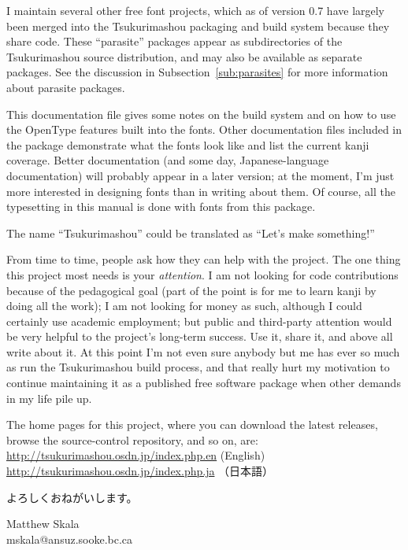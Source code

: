 \documentclass[14pt]{extarticle}
\begin{document}
I maintain several other free font projects, which as of version 0.7 have
largely been merged into the Tsukurimashou packaging and build system
because they share code.  These ``parasite'' packages appear as
subdirectories of the Tsukurimashou source distribution, and may also be
available as separate packages.  See the discussion in
Subsection~\ref{sub:parasites} for more information about parasite packages.

This documentation file gives some notes on the build system and on how
to use the OpenType features built into the fonts.  Other documentation
files included in the package demonstrate what the fonts look like and
list the current kanji coverage.  Better documentation (and some day,
Japanese-language documentation) will probably appear in a later
version; at the moment, I'm just more interested in designing fonts
than in writing about them.  Of course, all the typesetting in this
manual is done with fonts from this package.

The name ``Tsukurimashou'' could be translated as ``Let's make something!''

From time to time, people ask how they can help with the project.
The one thing this project most needs is your \emph{attention}.  I am not
looking for code contributions because of the pedagogical goal (part of the
point is for me to learn kanji by doing all the work); I am not looking for
money as such, although I could certainly use academic employment; but
public and third-party attention would be very helpful to the project's
long-term success.  Use it, share it, and above all write about it.
At this point I'm not even sure anybody but me has ever so much as run the
Tsukurimashou build process, and that really hurt my motivation to continue
maintaining it as a published free software package when other demands in my
life pile up.

The home pages for this project, where you can download the latest releases,
browse the source-control repository, and so on, are:\\
\hspace*{1em}\url{http://tsukurimashou.osdn.jp/index.php.en}%
\quad (English)\\
\hspace*{1em}\url{http://tsukurimashou.osdn.jp/index.php.ja}%
\quad（日本語）


よろしくおねがいします。

Matthew Skala\\mskala@ansuz.sooke.bc.ca\\\TsukurimashouReleaseDate
\end{document}
